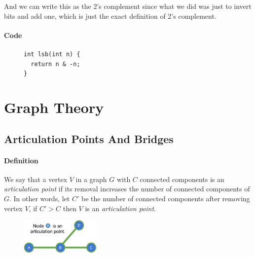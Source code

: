 \documentclass[twoside]{book}
\begin{document}
And we can write this as the 2's complement since what we did was just to invert bits and add one, which is just the exact definition of 2's complement.\\

\subsection*{Code}

\begin{figure}[thp]
  \centering
  \begin{minipage}[c]{0.9\textwidth}
    \begin{verbatim}
int lsb(int n) {
  return n & -n;
}
      \end{verbatim}
  \end{minipage}
\end{figure}

\egroup
\vspace{1em}
\begin{multicols*}{2}
\end{multicols*}
\part*{Graph Theory}
{
\chapter*{Articulation Points And Bridges}
}
\vspace*{2em}
\subsection*{Definition}
We say that a vertex $V$ in a graph $G$ with $C$
connected components is an \textit{articulation point} if its removal increases the number of connected components of $G$.
In other words, let $C'$ be the number of connected components after removing vertex $V$, if $C' > C$ then $V$ is an \textit{articulation point}.

\begin{figure}[H]
  \centering
  \includegraphics[width=0.35\textwidth]{"Images/Graph Theory/Articulation Points And Bridges/g1.pdf"}
  \caption{}
  \label{fig:apb_g1}
\end{figure}
\end{document}
